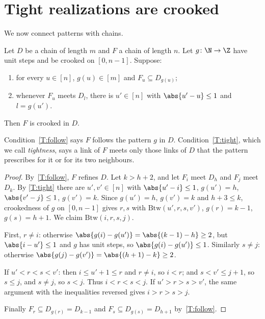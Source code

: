 
\section{Tight realizations are crooked}\label{sec:tight}

We now connect patterns with chains.

\begin{proposition}\label{prop:tight}
Let $D$ be a chain of length $m$ and $F$ a chain of length $n$. Let $g\colon\N\to\Z$ have unit
steps and be crooked on $[0,n-1]$. Suppose:
\begin{enumerate}[label=(T\arabic*)]
\item\label{T:follow} for every $u\in[n]$, $g(u)\in[m]$ and $F_u\subseteq D_{g(u)}$;
\item\label{T:tight} whenever $F_u$ meets $D_l$, there is $u'\in[n]$ with $\abs{u'-u}\le1$ and
$l=g(u')$.
\end{enumerate}
Then $F$ is crooked in $D$.
\end{proposition}

Condition~\ref{T:follow} says $F$ follows the pattern $g$ in $D$. Condition~\ref{T:tight}, which
we call \emph{tightness}, says a link of $F$ meets only those links of $D$ that the pattern
prescribes for it or for its two neighbours.

\begin{proof}
By~\ref{T:follow}, $F$ refines $D$. Let $k>h+2$, and let $F_i$ meet $D_h$ and $F_j$ meet $D_k$. By
\ref{T:tight} there are $u',v'\in[n]$ with $\abs{u'-i}\le1$, $g(u')=h$, $\abs{v'-j}\le1$,
$g(v')=k$. Since $g(u')=h$, $g(v')=k$ and $h+3\le k$, crookedness of $g$ on $[0,n-1]$ gives
$r,s$ with $\mathrm{Btw}(u',r,s,v')$, $g(r)=k-1$, $g(s)=h+1$. We claim
$\mathrm{Btw}(i,r,s,j)$.

First, $r\neq i$: otherwise $\abs{g(i)-g(u')}=\abs{(k-1)-h}\ge2$, but $\abs{i-u'}\le1$ and $g$
has unit steps, so $\abs{g(i)-g(u')}\le1$. Similarly $s\neq j$: otherwise
$\abs{g(j)-g(v')}=\abs{(h+1)-k}\ge2$.

If $u'<r<s<v'$: then $i\le u'+1\le r$ and $r\neq i$, so $i<r$; and $s<v'\le j+1$, so $s\le j$, and
$s\ne j$, so $s<j$. Thus $i<r<s<j$. If $u'>r>s>v'$, the same argument with the inequalities
reversed gives $i>r>s>j$.

Finally $F_r\subseteq D_{g(r)}=D_{k-1}$ and $F_s\subseteq D_{g(s)}=D_{h+1}$ by~\ref{T:follow}.
\end{proof}

